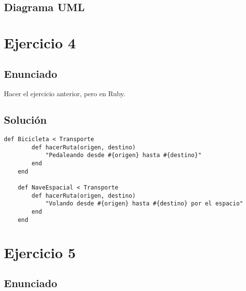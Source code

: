 \documentclass[a4paper,12pt]{article}
\begin{document}
\subsection*{Diagrama UML}

\begin{center}
\end{center}

\section{Ejercicio 4} 
\subsection{Enunciado}
Hacer el ejercicio anterior, pero en Ruby.
\subsection{Solución}


\begin{lstlisting}[style=customrb, caption={Clase Bicicleta y Clase Nave Espacial}]
    def Bicicleta < Transporte 
        def hacerRuta(origen, destino)
            "Pedaleando desde #{origen} hasta #{destino}"
        end
    end

    def NaveEspacial < Transporte 
        def hacerRuta(origen, destino)
            "Volando desde #{origen} hasta #{destino} por el espacio"
        end
    end
\end{lstlisting}

\section{Ejercicio 5}

\subsection{Enunciado}
\end{document}
